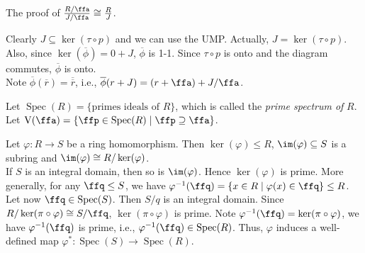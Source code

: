 \begin{remark}
    The proof of $\frac{R/\ffa}{J/\ffa} \cong \frac{R}{J}$.
    \begin{center}
    \end{center}
    Clearly $J \subseteq \ker(\tau \circ p)$ and we can use the UMP. Actually, $J = \ker(\tau \circ p)$. Also, since $\ker(\overline \phi) = 0+J$, $\overline \phi$ is 1-1. Since $\tau \circ p$ is onto and the diagram commutes, $\overline \phi$ is onto. \\
    Note $\overline \phi(\overline r) = \overline {\overline r}$, i.e., $\overline \phi(r + J) = (r+\ffa) + J/\ffa$.
\end{remark}

\begin{definition}
    Let $\operatorname{Spec}(R) = \{\text{primes ideals of $R$}\}$, which is called the \emph{prime spectrum of} $R$. \\
    Let $\operatorname{V}(\ffa) = \{\ffp \in \operatorname{Spec}(R) \mid \ffp \supseteq \ffa\}$.
\end{definition}

\begin{remark}[Fact]
    Let $\varphi: R \to S$ be a ring homomorphism. Then $\ker(\varphi) \leq R$, $\im(\varphi) \subseteq S$ is a subring and $\im(\varphi) \cong R/\ker(\varphi)$. \\
    If $S$ is an integral domain, then so is $\im(\varphi)$. Hence $\ker(\varphi)$ is prime. More generally, for any $\ffq \leq S$, we have $\varphi^{-1}(\ffq) = \{x \in R \mid \varphi(x) \in \ffq\} \leq R$. \\
    Let now $\ffq \in \operatorname{Spec}(S)$. Then $S/q$ is an integral domain. Since $R/\ker(\pi \circ \varphi) \cong S/\ffq$, $\ker(\pi \circ \varphi)$ is prime. Note $\varphi^{-1}(\ffq) = \ker(\pi \circ \varphi)$, we have $\varphi^{-1}(\ffq)$ is prime, i.e., $\varphi^{-1}(\ffq) \in \operatorname{Spec}(R)$. Thus, $\varphi$ induces a well-defined map $\varphi^*: \operatorname{Spec}(S) \to \operatorname{Spec}(R)$.
    \begin{center}
    \end{center}
\end{remark}

